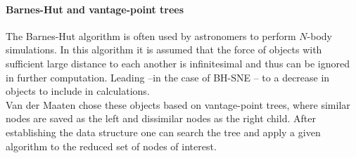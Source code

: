\documentclass[twocolumn]{bmcart}%
\begin{document}
\paragraph*{Barnes-Hut and vantage-point trees}
The Barnes-Hut algorithm is often used by astronomers to perform $N$-body simulations\cite{DBLP:journals/corr/abs-1301-3342}. In this algorithm it is assumed that the force of objects with sufficient large distance to each another is infinitesimal and thus can be ignored in further computation. Leading --in the case of BH-SNE -- to a decrease in objects to include in calculations.\\
Van der Maaten chose these objects based on vantage-point trees, where similar nodes are saved as the left and dissimilar nodes as the right child. After establishing the data structure one can search the tree and apply a given algorithm to the reduced set of nodes of interest. \\
\end{document}
